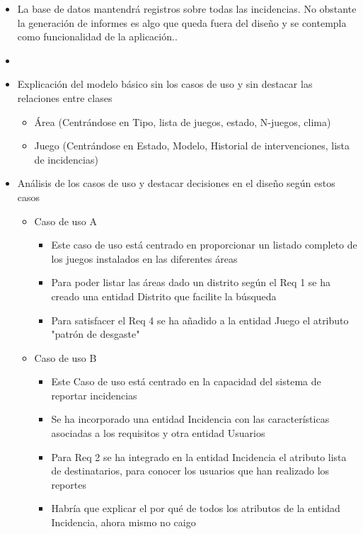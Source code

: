 \documentclass[]{article}
\begin{document}
\begin{itemize}
    \item La base de datos mantendrá registros sobre todas las incidencias. No obstante la generación de informes es algo que queda fuera del diseño y se contempla como funcionalidad de la aplicación..
    \item 
\end{itemize}

\begin{itemize}
    \item Explicación del modelo básico sin los casos de uso y sin destacar las relaciones entre clases
    \begin{itemize}
        \item Área (Centrándose en Tipo, lista de juegos, estado, N-juegos, clima)
        \item Juego (Centrándose en Estado, Modelo, Historial de intervenciones, lista de incidencias)
    \end{itemize}
    \item Análisis de los casos de uso y destacar decisiones en el diseño según estos casos
    \begin{itemize}
        \item Caso de uso A
        \begin{itemize}
            \item Este caso de uso está centrado en proporcionar un listado completo de los juegos instalados en las diferentes áreas
            \item Para poder listar las áreas dado un distrito según el Req 1 se ha creado una entidad Distrito que facilite la búsqueda
            \item Para satisfacer el Req 4 se ha añadido a la entidad Juego el atributo "patrón de desgaste" 
        \end{itemize}
        \item Caso de uso B
        \begin{itemize}
            \item Este Caso de uso está centrado en la capacidad del sistema de reportar incidencias
            \item Se ha incorporado una entidad Incidencia con las características asociadas a los requisitos y otra entidad Usuarios
            \item Para Req 2 se ha integrado en la entidad Incidencia el atributo lista de destinatarios, para conocer los usuarios que han realizado los reportes
            \item Habría que explicar el por qué de todos los atributos de la entidad Incidencia, ahora mismo no caigo 

\end{itemize}
\end{itemize}
\end{itemize}
\end{document}
